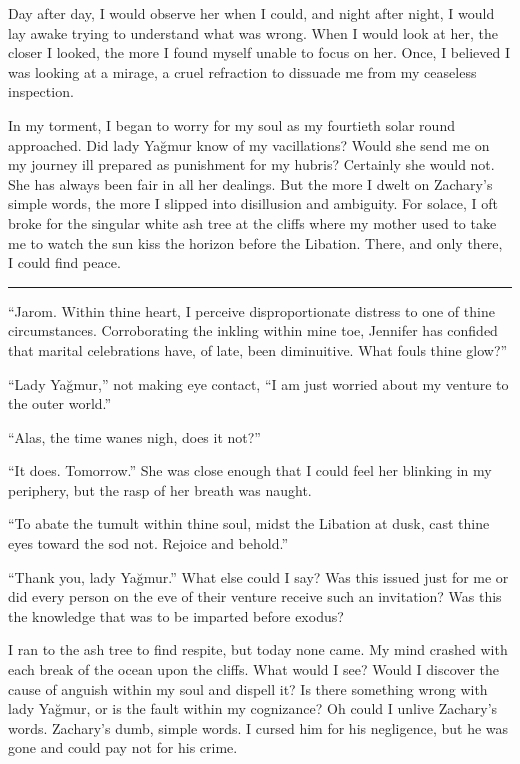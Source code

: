 \documentclass[11pt]{memoir}
\begin{document}
Day after day, I would observe her when I could, and night after night, I would lay awake trying to understand what was wrong. When I would look at her, the closer I looked, the more I found myself unable to focus on her. Once, I believed I was looking at a mirage, a cruel refraction to dissuade me from my ceaseless inspection.

In my torment, I began to worry for my soul as my fourtieth solar round approached. Did lady Yağmur know of my vacillations? Would she send me on my journey ill prepared as punishment for my hubris? Certainly she would not. She has always been fair in all her dealings. But the more I dwelt on Zachary's simple words, the more I slipped into disillusion and ambiguity. For solace, I oft broke for the singular white ash tree at the cliffs where my mother used to take me to watch the sun kiss the horizon before the Libation. There, and only there, I could find peace.

\noindent\rule{\textwidth}{1pt}

``Jarom. Within thine heart, I perceive disproportionate distress to one of thine circumstances. Corroborating the inkling within mine toe, Jennifer has confided that marital celebrations have, of late, been diminuitive. What fouls thine glow?''

``Lady Yağmur,'' not making eye contact, ``I am just worried about my venture to the outer world.''

``Alas, the time wanes nigh, does it not?''

``It does. Tomorrow.'' She was close enough that I could feel her blinking in my periphery, but the rasp of her breath was naught.

``To abate the tumult within thine soul, midst the Libation at dusk, cast thine eyes toward the sod not. Rejoice and behold.''

``Thank you, lady Yağmur.'' What else could I say? Was this issued just for me or did every person on the eve of their venture receive such an invitation? Was this the knowledge that was to be imparted before exodus?

I ran to the ash tree to find respite, but today none came. My mind crashed with each break of the ocean upon the cliffs. What would I see? Would I discover the cause of anguish within my soul and dispell it? Is there something wrong with lady Yağmur, or is the fault within my cognizance? Oh could I unlive Zachary's words. Zachary's dumb, simple words. I cursed him for his negligence, but he was gone and could pay not for his crime.
\end{document}
